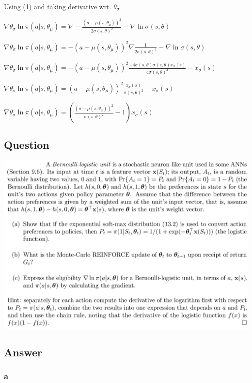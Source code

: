 \documentclass[11pt]{article}
\begin{document}
    \hfill \break
    \noindent Using (1) and taking derivative wrt. $ \theta_{\sigma} $

    \noindent $ \nabla \theta_\sigma  \ln \pi(a|s,\theta_\mu) = \nabla  - \frac{(a-\mu(s,\theta_\mu))^2}{2\sigma(s, \theta)^2} - \nabla  \ln \sigma(s,\theta)$

    \noindent $ \nabla \theta_\sigma  \ln \pi(a|s,\theta_\mu) = -(a-\mu(s,\theta_\mu))^2 \nabla \frac{1}{2\sigma(s, \theta)^2} - \nabla  \ln \sigma(s,\theta)$

    \noindent $ \nabla \theta_\sigma  \ln \pi(a|s,\theta_\mu) = -(a-\mu(s,\theta_\mu))^2  \frac{- 4\sigma(s, \theta) \sigma(s, \theta) x_\sigma(s) }{4\sigma(s, \theta)^4} - x_\sigma(s)$

    \noindent $ \nabla \theta_\sigma  \ln \pi(a|s,\theta_\mu) = (a-\mu(s,\theta_\mu))^2  \frac{x_\sigma(s) }{\sigma(s, \theta)^2} - x_\sigma(s)$

    \noindent $ \nabla \theta_\sigma  \ln \pi(a|s,\theta_\mu) = (\frac{(a-\mu(s,\theta_\mu))^2 }{\sigma(s, \theta)^2} - 1) x_\sigma(s)  $


    \subsection{Question}

    \includegraphics[scale=0.9]{exercise_13_5q}

    \subsection*{Answer}

    \subsubsection*{a}
\end{document}
